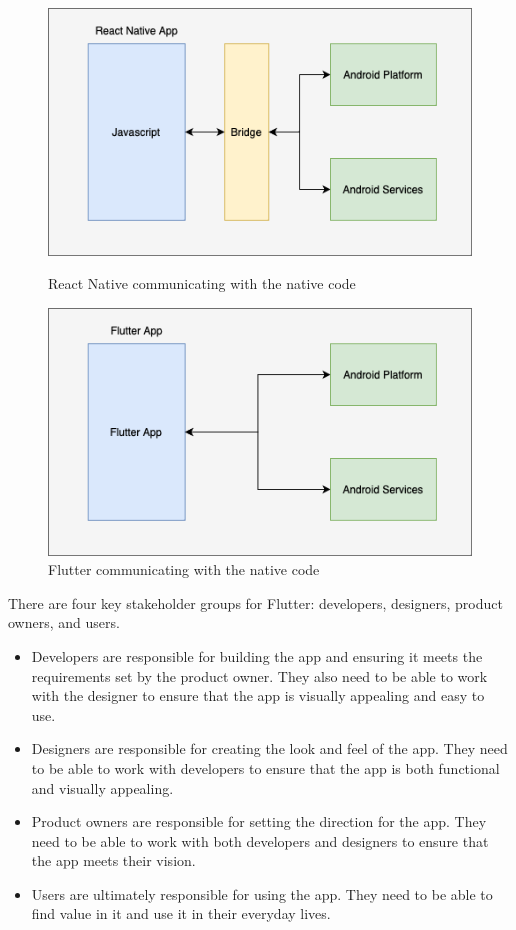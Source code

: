\documentclass[conference, onecolumn]{IEEEtran}
\begin{document}
\begin{figure}[h]\label{comparison}
    \centering
    \begin{minipage}[b]{0.4\textwidth}
        \includegraphics[width=\textwidth]{images/flutter-rn.drawio.png}
        \caption{React Native communicating with the native code}
    \end{minipage}
    \hfill
    \begin{minipage}[b]{0.4\textwidth}
        \includegraphics[width=\textwidth]{images/flutter-fl.drawio.png}
        \caption{Flutter communicating with the native code}
    \end{minipage}
\end{figure}
There are four key stakeholder groups for Flutter: developers, designers, product owners, and users.
\begin{itemize}
    \item Developers are responsible for building the app and ensuring it meets the requirements set by the product owner. They also need to be able to work with the designer to ensure that the app is visually appealing and easy to use. 
    \item Designers are responsible for creating the look and feel of the app. They need to be able to work with developers to ensure that the app is both functional and visually appealing. 
    \item Product owners are responsible for setting the direction for the app. They need to be able to work with both developers and designers to ensure that the app meets their vision. 
    \item Users are ultimately responsible for using the app. They need to be able to find value in it and use it in their everyday lives.
\end{itemize} 
\end{document}
